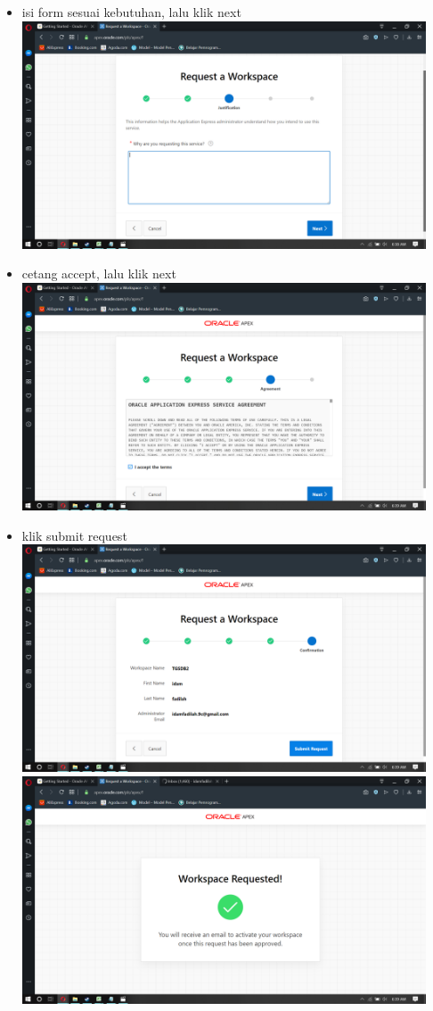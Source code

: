 \documentclass[a4paper,12pt]{report}
\begin{document}
\begin{itemize}
	\item isi form sesuai kebutuhan, lalu klik next\\	\includegraphics[width=12cm]{gambar/Screenshot (110).png} 
	\item cetang accept, lalu klik next\\	\includegraphics[width=12cm]{gambar/Screenshot (111).png} 
	\item klik submit request\\	\includegraphics[width=12cm]{gambar/Screenshot (112).png} \\	\includegraphics[width=12cm]{gambar/Screenshot (113).png} 

\end{itemize}
\end{document}

